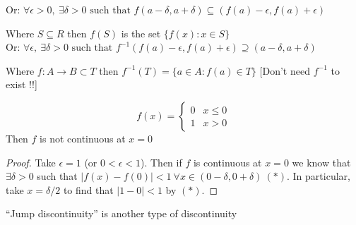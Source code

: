 Or: $\forall \epsilon > 0, ~ \exists \delta > 0 \text{ such that } f(a- \delta, a + \delta) \subseteq (f(a)- \epsilon, f(a) + \epsilon)$

Where $S\subseteq R$ then $f(S)$ is the set $\{f(x):x \in S\}$\\

Or: $\forall \epsilon,~\exists \delta >0 \text{ such that } f^{-1}(f(a) - \epsilon, f(a) + \epsilon) \supseteq (a - \delta, a + \delta)$

Where $f: A \to B \subset T$ then $f^{-1}(T) = \{a \in A:f(a) \in T\}$ [Don't need $f^{-1}$ to exist !!]\\


\begin{example}
\[f(x) = \begin{cases}
 0 & x \leq 0 \\
 1 & x > 0	
 \end{cases}
\]	 Then $f$ is not continuous at $x = 0$

\begin{proof}
Take $\epsilon = 1$ (or $0 < \epsilon < 1$). Then if $f$ is continuous at $x = 0$ we know that $\exists \delta > 0$ such that $|f(x) - f(0)| < 1~ \forall x \in (0 - \delta, 0 + \delta)~(*)$. In particular, take $x = \delta/2$ to find that $|1-0| < 1$ by 	$(*)$.
\end{proof}
\end{example}

``Jump discontinuity'' is another type of discontinuity\\


